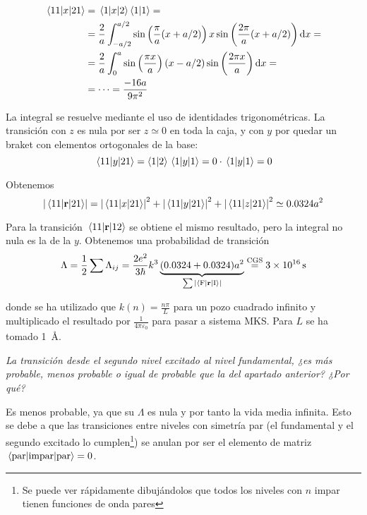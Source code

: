 \begin{equation}
  \begin{split}
    \mel{11}{x}{21} &= \mel{1}{x}{2}\braket{1}{1} = \\
    &= \frac{2}{a}\int_{-a/2}^{a/2} \sin \left( \frac{\pi}{a}(x+a/2)
    \right) x \sin \left( \frac{2\pi}{a}(x+a/2) \right) \dd{x} = \\
    &= \frac{2}{a} \int_0^a \sin \left( \frac{\pi x}{a} \right)
    (x-a/2) \sin \left( \frac{2\pi x}{a} \right) \dd{x} = \\
    &= \cdots = \frac{-16a}{9\pi^2}
  \end{split}
\end{equation}

La integral se resuelve mediante el uso de identidades
trigonométricas. La transición con $z$ es nula por ser $z\simeq 0$ en
toda la caja, y con $y$ por quedar un braket con elementos ortogonales
de la base:
\begin{equation}
  \mel{11}{y}{21} = \braket{1}{2} \mel{1}{y}{1} = 0 \cdot
  \mel{1}{y}{1} = 0
\end{equation}

Obtenemos
\begin{equation}
  \abs{\mel{11}{\bm{\mathrm{r}}}{21}} = \abs{\mel{11}{x}{21}}^2 +
  \abs{\mel{11}{y}{21}}^2 + \abs{\mel{11}{z}{21}}^2 \simeq 0.0324 a^2
\end{equation}

Para la transición $\mel{11}{\bm{\mathrm{r}}}{12}$ se obtiene el mismo
resultado, pero la integral no nula es la de la $y$. Obtenemos una
probabilidad de transición
\begin{equation}
  \Lambda = \frac{1}{2} \sum \Lambda_{ij} = \frac{2e^2}{3 \hbar}k^3
  \underbrace{(0.0324+0.0324)a^2}_{\sum
    \abs{\mel{\text{F}}{\bm{\mathrm{r}}}{\text{I}}}} \stackrel{\text{CGS}}{=} \SI{3e16}{\second}
\end{equation}

donde se ha utilizado que $k(n)=\frac{n\pi}{L}$ para un pozo cuadrado
infinito y multiplicado el resultado por $\frac{1}{4\pi\varepsilon_0}$
para pasar a sistema MKS. Para $L$ se ha tomado \SI{1}{\angstrom}.

\begin{tcolorbox}[halign=left]
  \emph{La transición desde el segundo nivel excitado al nivel
    fundamental, ¿es más probable, menos probable o igual de probable
    que la del apartado anterior? ¿Por qué?}
\end{tcolorbox}

Es menos probable, ya que su $\Lambda$ es nula y por tanto la vida
media infinita. Esto se debe a que las transiciones entre niveles
con simetría par (el fundamental y el segundo excitado lo cumplen\footnote{Se puede
  ver rápidamente dibujándolos que todos los niveles con $n$ impar tienen
funciones de onda pares}) se anulan por ser
el elemento de matriz $\mel{\text{par}}{\text{impar}}{\text{par}}=0$.


